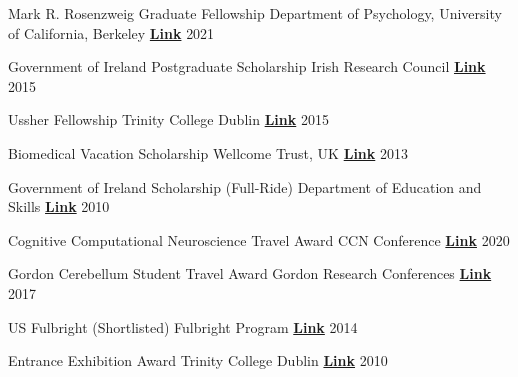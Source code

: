 

\begin{cvhonors}

 \cvhonor
    {Mark R. Rosenzweig Graduate Fellowship} %
    {Department of Psychology, University of California, Berkeley}
    {\href{https://psychology.berkeley.edu/give/endowed-funds}{\textbf{Link}}}
  	{2021}

 \cvhonor
   {Government of Ireland Postgraduate Scholarship}
   {Irish Research Council}
   {\href{https://research.ie/funding/goipg/}{\textbf{Link}}}
   {2015}
   
 \cvhonor
   {Ussher Fellowship}
   {Trinity College Dublin}
   {\href{https://www.tcd.ie/study/international/scholarships/Postgraduate/ussher.php}{\textbf{Link}}}
   {2015}

  \cvhonor
   {Biomedical Vacation Scholarship}
   {Wellcome Trust, UK}
   {\href{https://wellcome.org/}{\textbf{Link}}}
   {2013}

  \cvhonor
   {Government of Ireland Scholarship (Full-Ride)}
   {Department of Education and Skills}
   {\href{ https://www.gov.ie/en/service/third-level-scholarships/}{\textbf{Link}}}
   {2010}
   
\end{cvhonors}


\begin{cvhonors}
  
 \cvhonor
   {Cognitive Computational Neuroscience Travel Award}
   {CCN Conference}
   {\href{https://2021.ccneuro.org/index.php}{\textbf{Link}}}
   {2020}
   
 \cvhonor
   {Gordon Cerebellum Student Travel Award}
   {Gordon Research Conferences}
   {\href{https://www.grc.org/cerebellum-grs-conference/2017/}{\textbf{Link}}}
   {2017}
     
 \cvhonor
   {US Fulbright (Shortlisted)}
   {Fulbright Program}
   {\href{https://www.fulbright.ie/going-to-the-usa/fulbright-irish-scholar-awards/}{\textbf{Link}}}
   {2014}
   
  \cvhonor
   {Entrance Exhibition Award}
   {Trinity College Dublin}
   {\href{https://www.tcd.ie/study/undergraduate/entrance-exhibition/}{\textbf{Link}}}
   {2010}
 
\end{cvhonors}

